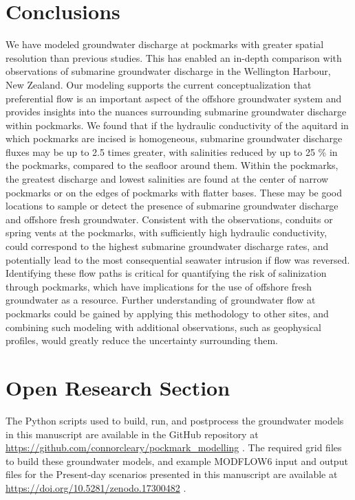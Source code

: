 \documentclass[draft, 10pt]{agujournal2019}
\begin{document}
\section{Conclusions}
We have modeled groundwater discharge at pockmarks with greater spatial resolution than previous studies.
This has enabled an in-depth comparison with observations of submarine groundwater discharge in the Wellington Harbour, New Zealand.
Our modeling supports the current conceptualization that preferential flow is an important aspect of the offshore groundwater system and provides insights into the nuances surrounding submarine groundwater discharge within pockmarks.
We found that if the hydraulic conductivity of the aquitard in which pockmarks are incised is homogeneous, submarine groundwater discharge fluxes may be up to 2.5 times greater,
with salinities reduced by up to 25 \% in the pockmarks,
compared to the seafloor around them.
Within the pockmarks, the greatest discharge and lowest salinities are found at the center of narrow pockmarks or on the edges of pockmarks with flatter bases.
These may be good locations to sample or detect the presence of submarine groundwater discharge and offshore fresh groundwater.
Consistent with the observations, conduits or spring vents at the pockmarks, with sufficiently high hydraulic conductivity, could correspond to the highest submarine groundwater discharge rates, and potentially lead to the most consequential seawater intrusion if flow was reversed.
Identifying these flow paths is critical for quantifying the risk of salinization through pockmarks, which have implications for the use of offshore fresh groundwater as a resource.
Further understanding of groundwater flow at pockmarks could be gained by applying this methodology to other sites, and combining such modeling with additional observations, such as geophysical profiles, would greatly reduce the uncertainty surrounding them.

\section*{Open Research Section}
The Python scripts used to build, run, and postprocess the groundwater models in this manuscript are available in the GitHub repository at \url{https://github.com/connorcleary/pockmark_modelling} \cite{cleary_python_2025}. The required grid files to build these groundwater models, and example MODFLOW6 input and output files for the Present-day scenarios presented in this manuscript are available at \url{https://doi.org/10.5281/zenodo.17300482} \cite{cleary_grid_2025}.
\end{document}
